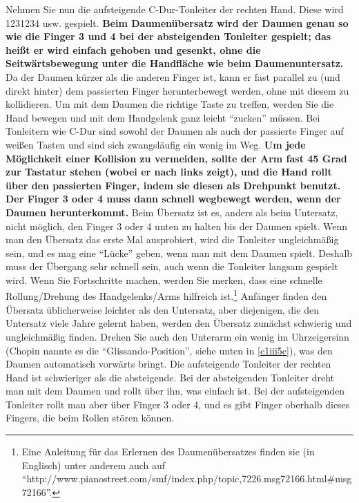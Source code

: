 Nehmen Sie nun die aufsteigende C-Dur-Tonleiter der rechten Hand.
Diese wird 1231234 usw. gespielt.
\textbf{Beim Daumenübersatz wird der Daumen genau so wie die Finger 3 und 4 bei der absteigenden Tonleiter gespielt; das heißt er wird einfach gehoben und gesenkt, ohne die Seitwärtsbewegung unter die Handfläche wie beim Daumenuntersatz.}
Da der Daumen kürzer als die anderen Finger ist, kann er fast parallel zu (und direkt hinter) dem passierten Finger herunterbewegt werden, ohne mit diesem zu kollidieren.
Um mit dem Daumen die richtige Taste zu treffen, werden Sie die Hand bewegen und mit dem Handgelenk ganz leicht \enquote{zucken} müssen.
Bei Tonleitern wie C-Dur sind sowohl der Daumen als auch der passierte Finger auf weißen Tasten und sind sich zwangsläufig ein wenig im Weg.
\textbf{Um jede Möglichkeit einer Kollision zu vermeiden, sollte der Arm fast 45 Grad zur Tastatur stehen (wobei er nach links zeigt), und die Hand rollt über den passierten Finger, indem sie diesen als Drehpunkt benutzt.
Der Finger 3 oder 4 muss dann schnell wegbewegt werden, wenn der Daumen herunterkommt.}
Beim Übersatz ist es, anders als beim Untersatz, nicht möglich, den Finger 3 oder 4 unten zu halten bis der Daumen spielt.
Wenn man den Übersatz das erste Mal ausprobiert, wird die Tonleiter ungleichmäßig sein, und es mag eine \enquote{Lücke} geben, wenn man mit dem Daumen spielt.
Deshalb muss der Übergang sehr schnell sein, auch wenn die Tonleiter langsam gespielt wird.
Wenn Sie Fortschritte machen, werden Sie merken, dass eine schnelle Rollung/Drehung des Handgelenks/Arms hilfreich ist.\footnote{Eine Anleitung für das Erlernen des Daumenübersatzes finden sie (in Englisch) unter anderem auch auf \enquote{http://www.pianostreet.com/smf/index.php/topic,7226.msg72166.html\#msg72166}.}
Anfänger finden den Übersatz üblicherweise leichter als den Untersatz, aber diejenigen, die den Untersatz viele Jahre gelernt haben, werden den Übersatz zunächst schwierig und ungleichmäßig finden.
Drehen Sie auch den Unterarm ein wenig im Uhrzeigersinn (Chopin nannte es die \enquote{Glissando-Position}, siehe unten in \hyperref[c1iii5c]{\autoref{c1iii5c}}), was den Daumen automatisch vorwärts bringt.
Die aufsteigende Tonleiter der rechten Hand ist schwieriger als die absteigende.
Bei der absteigenden Tonleiter dreht man mit dem Daumen und rollt über ihn, was einfach ist.
Bei der aufsteigenden Tonleiter rollt man aber über Finger 3 oder 4, und es gibt Finger oberhalb dieses Fingers, die beim Rollen stören können.

